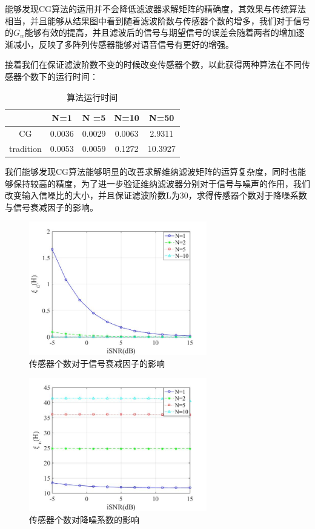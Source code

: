 能够发现CG算法的运用并不会降低滤波器求解矩阵的精确度，其效果与传统算法相当，并且能够从结果图中看到随着滤波阶数与传感器个数的增多，我们对于信号的$G_w$能够有效的提高，并且滤波后的信号与期望信号的误差会随着两者的增加逐渐减小，反映了多阵列传感器能够对语音信号有更好的增强。

接着我们在保证滤波阶数不变的时候改变传感器个数，以此获得两种算法在不同传感器个数下的运行时间：
\begin{table}[hbt]
	\caption{算法运行时间}
	\centering
	\begin{tabular}{ccccc}
		\toprule
		 & N=1 & N =5& N=10& N=50\\
		\midrule
		CG& 0.0036& 0.0029 & 0.0063& 2.9311\\
		tradition&0.0053&0.0059&0.1272& 10.3927\\
		\bottomrule
	\end{tabular}
	\label{tab:label}
\end{table}

我们能够发现CG算法能够明显的改善求解维纳滤波矩阵的运算复杂度，同时也能够保持较高的精度，为了进一步验证维纳滤波器分别对于信号与噪声的作用，我们改变输入信噪比的大小，并且保证滤波阶数L为30，求得传感器个数对于降噪系数与信号衰减因子的影响。
\begin{figure}[ht]
	\centering
	\includegraphics[width=\linewidth,height=5.82cm]{pic/111.jpg}
	\caption{传感器个数对于信号衰减因子的影响}
	\label{111}
\end{figure}
\begin{figure}[ht]
	\centering
	\includegraphics[width=\linewidth,height=5.82cm]{pic/222jpg.jpg}
	\caption{传感器个数对降噪系数的影响}
	\label{222}
\end{figure}

